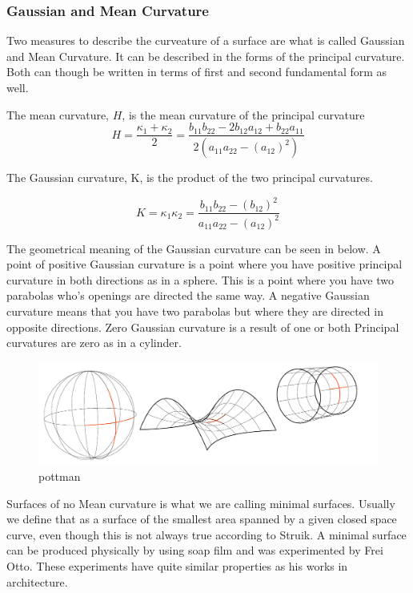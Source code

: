 \subsubsection{Gaussian and Mean Curvature}

Two measures to describe the curveature of a surface are what is called Gaussian and Mean Curvature. It can be described in the forms of the principal curvature. Both can though be written in terms of first and second fundamental form as well.

The mean curvature, $H$, is the mean curvature of the principal curvature
\begin{equation}
H = \frac{\kappa_1 + \kappa_2}{2} =\frac{b_{11}b_{22} - 2b_{12}a_{12} + b_{22}a_{11}}{2(a_{11}a_{22} - (a_{12})^2)}
\end{equation}

The Gaussian curvature, K, is the product of the two
principal curvatures.

\begin{equation}
K = {\kappa_1 \kappa_2} = \frac{b_{11} b_{22} - (b_{12})^2}{a_{11}a_{22} - (a_{12})^2}
\end{equation}

The geometrical meaning of the Gaussian curvature can be seen in below.  A point of positive Gaussian curvature is a point where you have positive principal curvature in both directions as in a sphere. This is a point where you have two parabolas who's openings are directed the same way. A negative Gaussian curvature means that you have two parabolas but where they are directed in opposite directions. Zero Gaussian curvature is a result of one or both Principal curvatures are zero as in a cylinder.

\begin{figure}[H] 
\centering
\includegraphics[width=1\linewidth ]{figure/Theory/GaussForms.pdf}
\caption{pottman}
\end{figure}

Surfaces of no Mean curvature is what we are calling minimal surfaces. Usually we define that as a surface of the smallest area spanned by a given closed space curve, even though this is not always true according to Struik. 
A minimal surface can be produced physically by using soap film and was experimented by Frei Otto. These experiments have quite similar properties as his works in architecture. 

